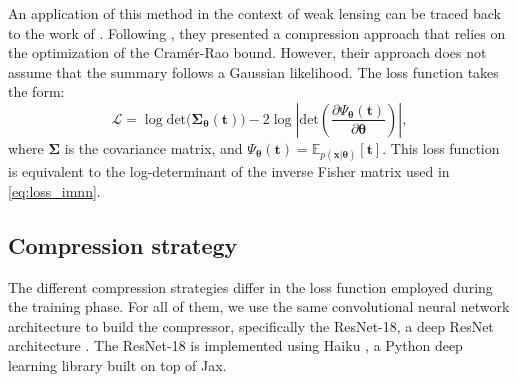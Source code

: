 \documentclass{aa}
\begin{document}
An application of this method in the context of weak lensing can be traced back to the work of \citet{fluri2021cosmological, fluri2022full}. Following \citet{charnock2018automatic}, they presented a compression approach that relies on the optimization of the Cramér-Rao bound. However, their approach does not assume that the summary follows a Gaussian likelihood. The loss function takes the form:
\begin{equation}\label{eq:loss_gfim}
\mathcal{L}=\log{\text{det}(\bm{\Sigma}_{\bm{\theta}}(\bm{t})})-2\log{\left|\text{det}\left(\frac{\partial \Psi_{\bm{\theta}}(\bm{t})}{\partial \bm{\theta}}\right)\right|},
\end{equation}
where $\bm{\Sigma}$ is the covariance matrix, and $\Psi_{\bm{\theta}}(\bm{t})=\mathbb{E}_{p(\bm {x}|\bm {\theta})}[\bm{t}]$.
This loss function is equivalent to the log-determinant of the inverse Fisher matrix used in \autoref{eq:loss_imnn}. \\
\subsection{Compression strategy}
The different compression strategies differ in the loss function employed during the training phase. For all of them, we use the same convolutional neural network architecture to build the compressor, specifically the ResNet-18, a deep ResNet architecture \citep{he2016deep}. The ResNet-18 is implemented using Haiku \citep{haiku2020github}, a Python deep learning library built on top of Jax.
\end{document}
